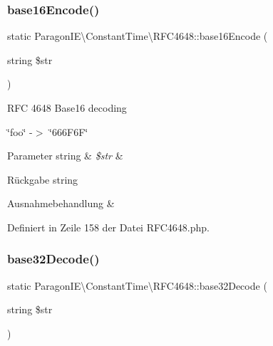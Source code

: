\subsubsection{\texorpdfstring{base16\+Encode()}{base16Encode()}}
{\footnotesize\ttfamily static Paragon\+I\+E\textbackslash{}\+Constant\+Time\textbackslash{}\+R\+F\+C4648\+::base16\+Encode (\begin{DoxyParamCaption}\item[{string}]{\$str }\end{DoxyParamCaption})\hspace{0.3cm}{\ttfamily [static]}}

R\+FC 4648 Base16 decoding

\char`\"{}foo\char`\"{} -\/$>$ \char`\"{}666\+F6\+F\char`\"{}


\begin{DoxyParams}[1]{Parameter}
string & {\em \$str} & \\
\hline
\end{DoxyParams}
\begin{DoxyReturn}{Rückgabe}
string 
\end{DoxyReturn}

\begin{DoxyExceptions}{Ausnahmebehandlung}
{\em } & \\
\hline
\end{DoxyExceptions}


Definiert in Zeile 158 der Datei R\+F\+C4648.\+php.

\mbox{\label{class_paragon_i_e_1_1_constant_time_1_1_r_f_c4648_a23c50e86d64a756e67b23769ec0ab93e}} 
\subsubsection{\texorpdfstring{base32\+Decode()}{base32Decode()}}
{\footnotesize\ttfamily static Paragon\+I\+E\textbackslash{}\+Constant\+Time\textbackslash{}\+R\+F\+C4648\+::base32\+Decode (\begin{DoxyParamCaption}\item[{string}]{\$str }\end{DoxyParamCaption})\hspace{0.3cm}{\ttfamily [static]}}

